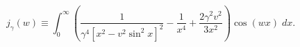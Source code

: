 \begin{equation} 
\label{hsF} 
j_{\gamma}(w)\equiv %
\int _{0}^{\infty}\left(\frac{1}{\gamma ^4[x^2-v^2\sin ^2 x]^2}- 
\frac{1}{x^4}+\frac{2\gamma ^2 v^2}{3x^2}\right)\cos (wx)\; d x. 
\end{equation} 
